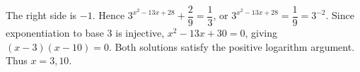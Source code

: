 The right side is $-1$. Hence $3^{x^2-13x+28}+\dfrac{2}{9}=\dfrac{1}{3}$, or $3^{x^2-13x+28}=\dfrac{1}{9}=3^{-2}$. Since exponentiation to base $3$ is injective, $x^2-13x+30=0$, giving $(x-3)(x-10)=0$. Both solutions satisfy the positive logarithm argument. Thus $\boxed{x=3,10}$.
